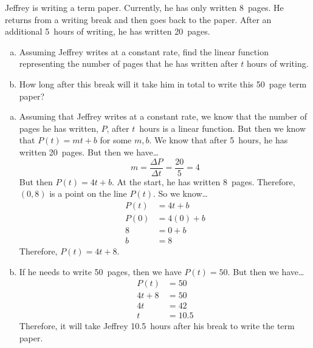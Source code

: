 \documentclass[11pt,letterpaper]{article}
\begin{document}

 Jeffrey is writing a term paper. Currently, he has only written 8~pages. He returns from a writing break and then goes back to the paper. After an additional 5~hours of writing, he has written 20~pages. 
	\begin{enumerate}[(a)]
	\item Assuming Jeffrey writes at a constant rate, find the linear function representing the number of pages that he has written after $t$ hours of writing. 
	\item How long after this break will it take him in total to write this 50~page term paper?
	\end{enumerate} \pspace

\sol 
\begin{enumerate}[(a)]
\item Assuming that Jeffrey writes at a constant rate, we know that the number of pages he has written, $P$, after $t$~hours is a linear function. But then we know that $P(t)= mt + b$ for some $m, b$. We know that after 5~hours, he has written 20~pages. But then we have\dots
	\[
	m= \dfrac{\Delta P}{\Delta t}= \dfrac{20}{5}= 4
	\]
But then $P(t)= 4t + b$. At the start, he has written 8~pages. Therefore, $(0, 8)$ is a point on the line $P(t)$. So we know\dots
	\[
	\begin{aligned}
	P(t)&= 4t + b \\[0.3cm]
	P(0)&= 4(0) + b \\[0.3cm]
	8&= 0 + b \\[0.3cm]
	b&= 8
	\end{aligned}
	\]
Therefore, $P(t)= 4t + 8$. \pspace

\item If he needs to write 50~pages, then we have $P(t)= 50$. But then we have\dots
	\[
	\begin{aligned}
	P(t)&= 50 \\[0.3cm]
	4t + 8&= 50 \\[0.3cm]
	4t&= 42 \\[0.3cm]
	t&= 10.5
	\end{aligned}
	\]
Therefore, it will take Jeffrey 10.5~hours after his break to write the term paper. 
\end{enumerate}



\newpage
\end{document}
